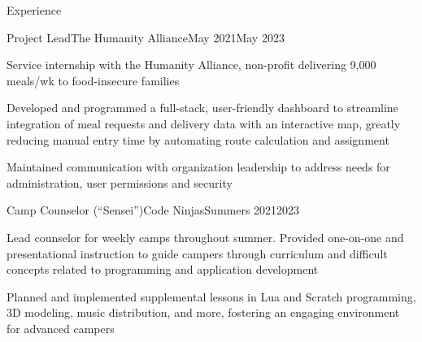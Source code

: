 \documentclass{resume} %
\begin{document}

\begin{rSection}{Experience}
  \begin{rItem}{Project Lead}{The Humanity Alliance}{May 2021}{May 2023}
    \item Service internship with the Humanity Alliance, non-profit delivering 9,000 meals/wk to food-insecure families
    \item Developed and programmed a full-stack, user-friendly dashboard to streamline integration of meal requests and delivery data with an interactive map, greatly reducing manual entry time by automating route calculation and assignment
    \item Maintained communication with organization leadership to address needs for  administration, user permissions and security
  \end{rItem}

  \begin{rItem}{Camp Counselor (``Sensei'')}{Code Ninjas}{Summers 2021}{2023}
    \item Lead counselor for weekly camps throughout summer. Provided one-on-one and presentational instruction to guide campers through curriculum and difficult concepts related to programming and application development
    \item Planned and implemented supplemental lessons in Lua and Scratch programming, 3D modeling, music distribution, and more, fostering an engaging environment for advanced campers
  \end{rItem}
\end{rSection}

\end{document}
